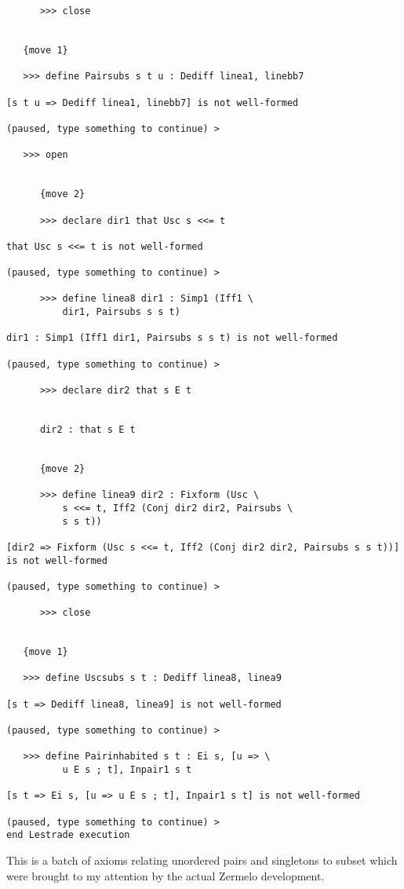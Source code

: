 \documentclass[12pt]{article}
\begin{document}
\begin{verbatim}
      >>> close


   {move 1}

   >>> define Pairsubs s t u : Dediff linea1, linebb7

[s t u => Dediff linea1, linebb7] is not well-formed

(paused, type something to continue) >

   >>> open


      {move 2}

      >>> declare dir1 that Usc s <<= t

that Usc s <<= t is not well-formed

(paused, type something to continue) >

      >>> define linea8 dir1 : Simp1 (Iff1 \
          dir1, Pairsubs s s t)

dir1 : Simp1 (Iff1 dir1, Pairsubs s s t) is not well-formed

(paused, type something to continue) >

      >>> declare dir2 that s E t


      dir2 : that s E t


      {move 2}

      >>> define linea9 dir2 : Fixform (Usc \
          s <<= t, Iff2 (Conj dir2 dir2, Pairsubs \
          s s t))

[dir2 => Fixform (Usc s <<= t, Iff2 (Conj dir2 dir2, Pairsubs s s t))] is not well-formed

(paused, type something to continue) >

      >>> close


   {move 1}

   >>> define Uscsubs s t : Dediff linea8, linea9

[s t => Dediff linea8, linea9] is not well-formed

(paused, type something to continue) >

   >>> define Pairinhabited s t : Ei s, [u => \
          u E s ; t], Inpair1 s t

[s t => Ei s, [u => u E s ; t], Inpair1 s t] is not well-formed

(paused, type something to continue) >
end Lestrade execution
\end{verbatim}

This is a batch of axioms relating unordered pairs and singletons to subset which were brought to my attention by the actual Zermelo development.
\end{document}
